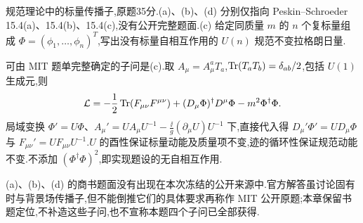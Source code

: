 \begin{exercise}
规范理论中的标量传播子,原题35分.(a)、(b)、(d) 分别仅指向 Peskin--Schroeder 15.4(a)、15.4(b)、15.4(c),没有公开完整题面.(c) 给定同质量 $m$ 的 $n$ 个复标量组成 $\Phi=(\phi_1,\ldots,\phi_n)^T$,写出没有标量自相互作用的 $U(n)$ 规范不变拉格朗日量.
\end{exercise}
\begin{solution}
可由 MIT 题单完整确定的子问是(c).取 $A_\mu=A_\mu^aT_a$,$\operatorname{Tr}(T_aT_b)=\delta_{ab}/2$,包括 $U(1)$ 生成元,则
\[
\mathcal L=-\frac12\operatorname{Tr}(F_{\mu\nu}F^{\mu\nu})
+(D_\mu\Phi)^\dagger D^\mu\Phi-m^2\Phi^\dagger\Phi.
\]
局域变换 $\Phi'=U\Phi$、$A_\mu'=UA_\mu U^{-1}-\frac{\ii}{g}(\partial_\mu U)U^{-1}$ 下,直接代入得 $D_\mu'\Phi'=UD_\mu\Phi$ 与 $F_{\mu\nu}'=UF_{\mu\nu}U^{-1}$.$U$ 的酉性保证标量动能及质量项不变,迹的循环性保证规范动能不变.不添加 $(\Phi^\dagger\Phi)^2$,即实现题设的无自相互作用.

(a)、(b)、(d) 的商书题面没有出现在本次冻结的公开来源中.官方解答虽讨论固有时与背景场传播子,但不能倒推它们的具体要求再称作 MIT 公开原题;本章保留书题定位,不补造这些子问,也不宣称本题四个子问已全部获得.
\end{solution}
